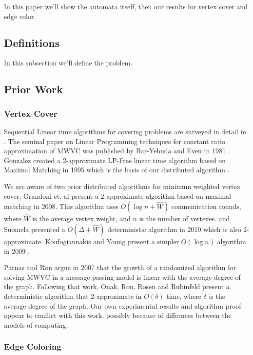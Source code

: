 \documentclass[twoside]{article}
\begin{document}
In this paper we'll show the automata itself, then our results for vertex cover and edge color.

\subsection{Definitions}

In this subsection we'll define the problem.

\subsection{Prior Work}

\subsubsection{Vertex Cover}

Sequential Linear time algorithms for covering problems are surveyed in detail in \cite{254190}. The seminal paper on Linear Programming techniques for constant ratio approximation of MWVC was published by Bar-Yehuda and Even in 1981 \cite{Bar-Yehuda:1981lr}. Gonzalez created a 2-approximate LP-Free linear time algorithm based on Maximal Matching in 1995 which is the basis of our distributed algorithm \cite{Gonzalez1995129}. 

We are aware of two prior distributed algorithms for minimum weighted vertex cover. Grandoni et. al present a 2-approximate algorithm based on maximal matching in 2008\cite{1435381}. This algorithm uses $O(\log n + \hat{W})$ communication rounds, where $\hat{W}$ is the average vertex weight, and $n$ is the number of vertexes. \AAstrand and Suomela presented a $O(\Delta + \hat{W})$ deterministic algorithm in 2010 which is also 2-approximate. Koufogiannakis and Young present a simpler $O(\log n)$ algorithm in 2009 \cite{1582746}. 

Parnas and Ron argue in 2007 that the growth of a randomized algorithm for solving MWVC in a message passing model is linear with the average degree of the graph\cite{Parnas:2007:AMV:1280283.1280327}. Following that work, Onak, Ron, Rosen and Rubinfeld present a deterministic algorithm that 2-approximate in $O(\delta)$ time, where $\delta$ is the average degree of the graph\cite{Onak:2012:NSA:2095116.2095204}. Our own experimental results and algorithm proof appear to conflict with this work, possibly because of differnces between the models of computing. 

\subsubsection{Edge Coloring}
\end{document}
